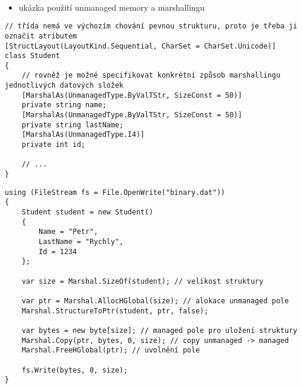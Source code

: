 \nezkouskove

\begin{frame}[fragile]
\vfill
\begin{bonusblock}{~}
\begin{itemize}
\item ukázka použití unmanaged memory a marshallingu
\end{itemize}
\end{bonusblock}
\vfill
\begin{yesblock}
\begin{lstlisting}
// třída nemá ve výchozím chování pevnou strukturu, proto je třeba ji označit atributem
[StructLayout(LayoutKind.Sequential, CharSet = CharSet.Unicode)]
class Student
{
    // rovněž je možné specifikovat konkrétní způsob marshallingu jednotlivých datových složek
    [MarshalAs(UnmanagedType.ByValTStr, SizeConst = 50)]
    private string name;
    [MarshalAs(UnmanagedType.ByValTStr, SizeConst = 50)]
    private string lastName;
    [MarshalAs(UnmanagedType.I4)]
    private int id;

    // ...
}
\end{lstlisting}
\end{yesblock}
\vfill
\end{frame}


\begin{frame}[fragile]
\begin{yesblock}
\begin{lstlisting}
using (FileStream fs = File.OpenWrite("binary.dat"))
{
    Student student = new Student()
    {
        Name = "Petr",
        LastName = "Rychly",
        Id = 1234
    };

    var size = Marshal.SizeOf(student); // velikost struktury

    var ptr = Marshal.AllocHGlobal(size); // alokace unmanaged pole
    Marshal.StructureToPtr(student, ptr, false); 

    var bytes = new byte[size]; // managed pole pro uložení struktury
    Marshal.Copy(ptr, bytes, 0, size); // copy unmanaged -> managed
    Marshal.FreeHGlobal(ptr); // uvolnění pole

    fs.Write(bytes, 0, size);
}
\end{lstlisting}
\end{yesblock}
\end{frame}


